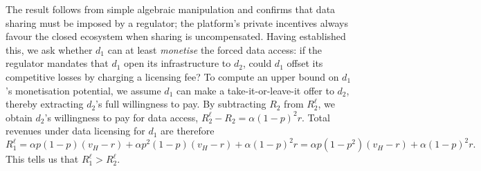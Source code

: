 \documentclass[11pt]{article}
\theoremstyle{plain}
\theoremstyle{definition}
\theoremstyle{plain}
\theoremstyle{plain}
\theoremstyle{plain}
\theoremstyle{plain}
\numberwithin{equation}{section}
\begin{document}
\noindent The result follows from simple algebraic manipulation and confirms that data sharing must be imposed by a regulator; the platform's private incentives always favour the closed ecosystem when sharing is uncompensated. Having established this, we ask whether $d_1$ can at least \textit{monetise} the forced data access: if the regulator mandates that $d_1$ open its infrastructure to $d_2$, could $d_1$ offset its competitive losses by charging a licensing fee? To compute an upper bound on $d_1$'s monetisation potential, we assume $d_1$ can make a take-it-or-leave-it offer to $d_2$, thereby extracting $d_2$'s full willingness to pay. By subtracting $R_2$ from $R_2^\ell$, we obtain $d_2$'s willingness to pay for data access, $R_2^\ell - R_2 = \alpha(1-p)^2r$. Total revenues under data licensing for $d_1$ are therefore
\begin{equation*}
     R_1^\ell = \alpha p (1-p)(v_H-r) + \alpha p^2 (1-p)(v_H-r) + \alpha(1-p)^2r = \alpha p (1-p^2)(v_H-r) + \alpha(1-p)^2r.
\end{equation*}
This tells us that $R_1^\ell > R_2^\ell$. 
\vspace{2mm}

\end{document}

